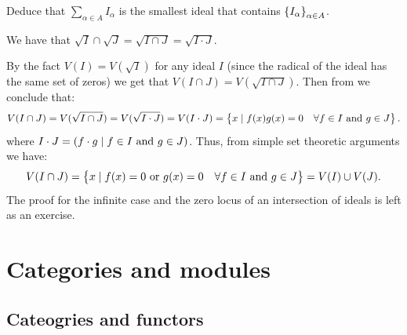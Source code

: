 \documentclass[11pt,a4paper]{article}
\begin{document}
\begin{exercise}
  Deduce that $\sum_{\alpha \in A} I_{\alpha}$
  is the smallest ideal that contains $\left\{I_{\alpha}\right\}_{\alpha \in A}$.
\end{exercise}

\begin{lemma}
  \label{lem:zariski-topology}
  We have that $\sqrt{I} \cap \sqrt{J} = \sqrt{I \cap J} = \sqrt{I \cdot J}$.
\end{lemma}

\begin{proofof}{}
  By the fact $V(I) = V(\sqrt{I})$ for any ideal $I$
  (since the radical of the ideal has the same set of zeros)
  we get that $V(I \cap J) = V(\sqrt{I \cap J})$.
  Then from  we conclude that:
  \[
    V(I \cap J) = V(\sqrt{I \cap J}) = V(\sqrt{I \cdot J}) = V(I \cdot J) =
    \left\{x \mid f(x)g(x) = 0 \quad \forall f \in I \text{ and } g \in J\right\}.
  \]
  where $I \cdot J = (f \cdot g \mid f \in I \text{ and } g \in J)$.
  Thus, from simple set theoretic arguments we have:
  \[
    V(I \cap J) =
    \left\{x \mid f(x) = 0 \text{ or } g(x) = 0 \quad \forall f \in I \text{ and } g \in J\right\} =
    V(I) \cup V(J).
  \]
  The proof for the infinite case and the zero locus of an intersection of ideals
  is left as an exercise.
\end{proofof}


\newpage

\section{Categories and modules}
\subsection{Cateogries and functors}
\end{document}
